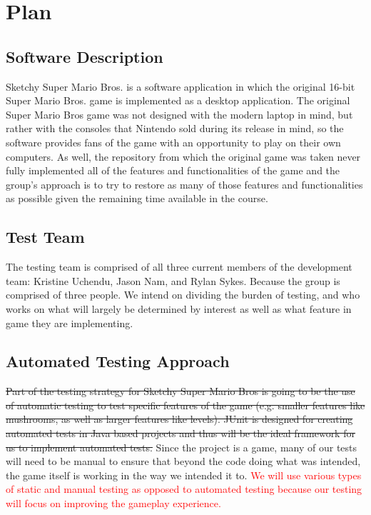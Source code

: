 \documentclass[12pt, titlepage]{article}
\begin{document}
\section{Plan}

\subsection{Software Description}

Sketchy Super  Mario Bros. is a software application in which the original 16-bit Super Mario Bros. game is implemented as a desktop application. The original Super Mario Bros game was not designed with the modern laptop in mind, but rather with the consoles that Nintendo sold during its release in mind,  so the software provides fans of the game with an opportunity to play on their own computers. As well, the repository from which the original game was taken never fully implemented all of the features and functionalities of the game and the group's approach is to try to restore as many of those features and functionalities as possible given the remaining time available in the course.

\subsection{Test Team}

The testing team is comprised of all three current members of the development team: Kristine Uchendu, Jason Nam, and Rylan Sykes. Because the group is comprised of three people. We intend on dividing the burden of testing, and who works on what will largely be determined by interest as well as what feature in game they are implementing.

\subsection{Automated Testing Approach}

\st{Part of the testing strategy for Sketchy Super Mario Bros is going to be the use of automatic testing to test specific features of the game (e.g. smaller features like mushrooms, as well as larger features like levels). JUnit is designed for creating automated tests in Java based projects and thus will be the ideal framework for us to implement automated tests. }Since the project is a game, many of our tests will need to be manual to ensure that beyond the code doing what was intended, the game itself is working in the way we intended it to. \textcolor{red}{We will use various types of static and manual testing as opposed to automated testing because our testing will focus on improving the gameplay experience.}
\end{document}
